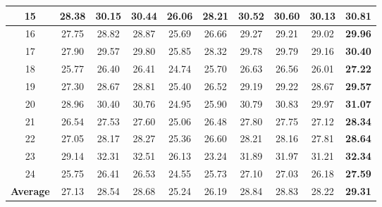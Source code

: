 \documentclass[10pt,onecolumn,letterpaper]{article}
\begin{document}
\begin{table}
\begin{center}
\begin{tabular}{|c||c|c|c|c|c|c|c|c|c|}
\hline
15 & 28.38 & 30.15 & 30.44 & 26.06 & 28.21 & 30.52 & 30.60 & 30.13 & \textbf{30.81}
\\
\hline
16 & 27.75 & 28.82 & 28.87 & 25.69 & 26.66 & 29.27 & 29.21 & 29.02 & \textbf{29.96}
\\
\hline
17 & 27.90 & 29.57 & 29.80 & 25.85 & 28.32 & 29.78 & 29.79 & 29.16 & \textbf{30.40}
\\
\hline
18 & 25.77 & 26.40 & 26.41 & 24.74 & 25.70 & 26.63 & 26.56 & 26.01 & \textbf{27.22}
\\
\hline
19 & 27.30 & 28.67 & 28.81 & 25.40 & 26.52 & 29.19 & 29.22 & 28.67 & \textbf{29.57}
\\
\hline
20 & 28.96 & 30.40 & 30.76 & 24.95 & 25.90 & 30.79 & 30.83 & 29.97 & \textbf{31.07}
\\
\hline
21 & 26.54 & 27.53 & 27.60 & 25.06 & 26.48 & 27.80 & 27.75 & 27.12 & \textbf{28.34}
\\
\hline
22 & 27.05 & 28.17 & 28.27 & 25.36 & 26.60 & 28.21 & 28.16 & 27.81 & \textbf{28.64}
\\
\hline
23 & 29.14 & 32.31 & 32.51 & 26.13 & 23.24 & 31.89 & 31.97 & 31.21 & \textbf{32.34}
\\
\hline
24 & 25.75 & 26.41 & 26.53 & 24.55 & 25.73 & 27.10 & 27.03 & 26.18 & \textbf{27.59}
\\
\hline
\textbf{Average} & 27.13 & 28.54 & 28.68 & 25.24 & 26.19 & 28.84 & 28.83 & 28.22 & \textbf{29.31}
\\
\hline
\end{tabular}
\end{center}
\end{table}
\end{document}
